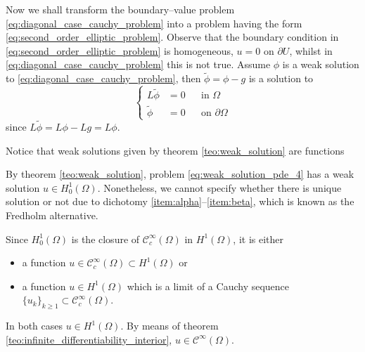 Now we shall transform the boundary--value problem
\eqref{eq:diagonal_case_cauchy_problem} into a problem having the form
\eqref{eq:second_order_elliptic_problem}. Observe that the boundary condition in
\eqref{eq:second_order_elliptic_problem} is homogeneous, \ie $u = 0$ on
$\partial U$, whilst in \eqref{eq:diagonal_case_cauchy_problem} this is not
true. Assume $\phi$ is a weak solution to
\eqref{eq:diagonal_case_cauchy_problem}, then $\tilde{\phi} = \phi - g$ is a solution to
\begin{equation} \label{eq:weak_solution_pde_4}
	\left\{
		\begin{aligned}
			L \tilde{\phi} &= 0 & &\text{in } \Omega \\
			\tilde{\phi} &= 0 	& &\text{on } \partial \Omega 
		\end{aligned}
	\right.
\end{equation}
since $L \tilde{\phi} = L \phi - L g = L \phi$.

\begin{remark*}
	Notice that weak solutions given by theorem \eqref{teo:weak_solution} are functions 
\end{remark*}

By theorem \ref{teo:weak_solution}, problem \eqref{eq:weak_solution_pde_4} has a
weak solution $u \in H_0^1(\Omega)$. Nonetheless, we cannot specify whether
there is unique solution or not due to dichotomy
\ref{item:alpha}--\ref{item:beta}, which is known as the Fredholm alternative.

Since $H_0^1(\Omega)$ is the closure of $\mathcal{C}_c^\infty(\Omega)$ in $H^1(\Omega)$, it is either
\begin{itemize}[topsep=0pt]
	\item a function $u \in \mathcal{C}_c^\infty(\Omega) \subset H^1(\Omega)$ or
	\item a function $u \in H^1(\Omega)$ which is a limit of a Cauchy sequence
	$\{ u_k \}_{k \geq 1} \subset \mathcal{C}_c^\infty(\Omega)$.
\end{itemize}
In both cases $u \in H^1(\Omega)$. By means of theorem
\ref{teo:infinite_differentiability_interior}, $u \in \mathcal{C}^\infty(\Omega)$.